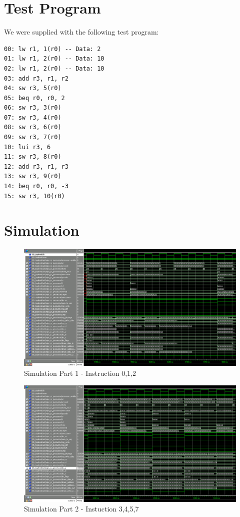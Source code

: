 \section{Test Program}
We were supplied with the following test program:
\begin{verbatim}
00: lw r1, 1(r0) -- Data: 2
01: lw r1, 2(r0) -- Data: 10
02: lw r1, 2(r0) -- Data: 10
03: add r3, r1, r2
04: sw r3, 5(r0)
05: beq r0, r0, 2
06: sw r3, 3(r0)
07: sw r3, 4(r0)
08: sw r3, 6(r0)
09: sw r3, 7(r0)
10: lui r3, 6
11: sw r3, 8(r0)
12: add r3, r1, r3
13: sw r3, 9(r0)
14: beq r0, r0, -3
15: sw r3, 10(r0)
\end{verbatim}



\section{Simulation}

\begin{figure}[ht]
    \centering
    \includegraphics[scale=0.3]{figures/sim1.png}
    \caption{\label{fig:sim1}Simulation Part 1 - Instruction 0,1,2}
\end{figure}

\begin{figure}[ht]
    \centering
    \includegraphics[scale=0.3]{figures/sim2.png}
    \caption{\label{fig:sim2}Simulation Part 2 - Instuction 3,4,5,7}
\end{figure}


